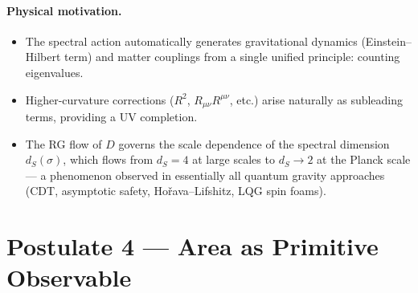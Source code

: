 \documentclass[12pt,a4paper]{article}
\theoremstyle{postulate}
\newcommand{\Dirac}{D}
\begin{document}
\paragraph{Physical motivation.}
\begin{itemize}
  \item The spectral action automatically generates gravitational dynamics
        (Einstein--Hilbert term) and matter couplings from a single unified
        principle: counting eigenvalues.
  \item Higher-curvature corrections ($R^2$, $R_{\mu\nu}R^{\mu\nu}$, etc.)
        arise naturally as subleading terms, providing a UV completion.
  \item The RG flow of $\Dirac$ governs the scale dependence of the spectral
        dimension $d_S(\sigma)$, which flows from $d_S = 4$ at large scales
        to $d_S \to 2$ at the Planck scale --- a phenomenon observed in
        essentially all quantum gravity approaches (CDT, asymptotic safety,
        Ho\v{r}ava--Lifshitz, LQG spin foams).
\end{itemize}


\section{Postulate 4 --- Area as Primitive Observable}\label{sec:P4}
\end{document}
